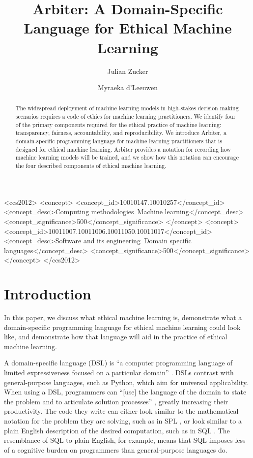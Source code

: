 \documentclass[sigconf]{acmart}
\title{Arbiter: A Domain-Specific Language for Ethical Machine Learning}
\author{Julian Zucker}
\affiliation{%
    \institution{Northeastern University}
}
\author{Myraeka d'Leeuwen}
\affiliation{%
    \institution{Northeastern University}
}
\begin{document}
\begin{abstract}
The widespread deployment of machine learning models in high-stakes decision making scenarios requires a code of ethics for machine learning practitioners. We identify four of the primary components required for the ethical practice of machine learning: transparency, fairness, accountability, and reproducibility. We introduce Arbiter, a domain-specific programming language for machine learning practitioners that is designed for ethical machine learning. Arbiter provides a notation for recording how machine learning models will be trained, and we show how this notation can encourage the four described components of ethical machine learning.
\end{abstract}

\begin{CCSXML}
<ccs2012>
<concept>
<concept_id>10010147.10010257</concept_id>
<concept_desc>Computing methodologies~Machine learning</concept_desc>
<concept_significance>500</concept_significance>
</concept>
<concept>
<concept_id>10011007.10011006.10011050.10011017</concept_id>
<concept_desc>Software and its engineering~Domain specific languages</concept_desc>
<concept_significance>500</concept_significance>
</concept>
</ccs2012>
\end{CCSXML}




\maketitle

\section{Introduction}
In this paper, we discuss what ethical machine learning is, demonstrate what a domain-specific programming language for ethical machine learning could look like, and demonstrate how that language will aid in the practice of ethical machine learning.

A domain-specific language (DSL) is ``a computer programming language of limited expressiveness focused on a particular domain'' \citep{Fowler2010}. DSLs contrast with general-purpose languages, such as Python, which aim for universal applicability. When using a DSL, programmers can ``[use] the language of the domain to state the problem and to articulate solution processes'' \citep{Felleisen2015}, greatly increasing their productivity. The code they write can either look similar to the mathematical notation for the problem they are solving, such as in SPL \citep{Werk2012}, or look similar to a plain English description of the desired computation, such as in SQL \citep{Date1997}. The resemblance of SQL to plain English, for example, means that SQL imposes less of a cognitive burden on programmers than general-purpose languages do.
\end{document}
